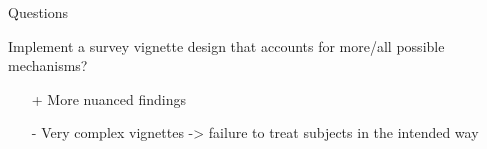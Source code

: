 \begin{frame}{Questions}
  
  Implement a survey vignette design that accounts for more/all possible mechanisms? 
  \begin{itemize}
    \item[+] More nuanced findings
    \item[-] Very complex vignettes -> failure to treat subjects in the intended way
  \end{itemize}

\end{frame}
